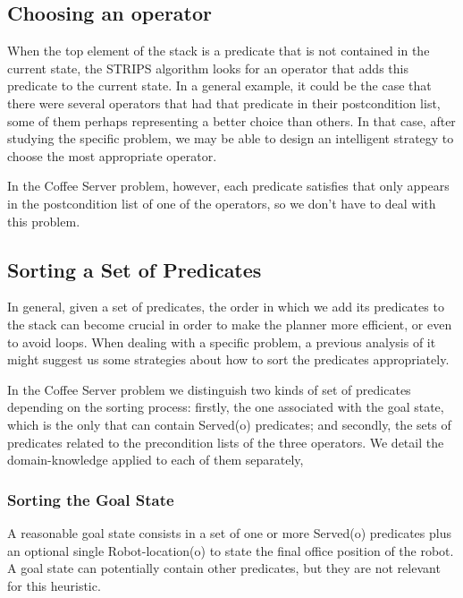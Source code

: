 \documentclass[12pt,a4paper,oneside]{article}
\numberwithin{equation}{section}
\numberwithin{equation}{section}
\theoremstyle{definition}
\begin{document}
\subsection{Choosing an operator} \label{Choosing an Operator}

When the top element of the stack is a predicate that is not contained in the current state, the STRIPS algorithm looks for an operator that adds this predicate to the current state. In a general example, it could be the case that there were several operators that had that predicate in their postcondition list, some of them perhaps representing a better choice than others. In that case, after studying the specific problem, we may be able to design an intelligent strategy to choose the most appropriate operator. 


In the Coffee Server problem, however, each predicate satisfies that only appears in the postcondition list of one of the operators, so we don’t have to deal with this problem.

\subsection{Sorting a Set of Predicates} \label{Sorting a Set of Predicates}

In general, given a set of predicates, the order in which we add its predicates to the stack can become crucial in order to make the planner more efficient, or even to avoid loops. When dealing with a specific problem, a previous analysis of it might suggest us some strategies about how to sort the predicates appropriately.


In the Coffee Server problem we distinguish two kinds of set of predicates depending on the sorting process: firstly, the one associated with the goal state, which is the only that can contain Served(o) predicates; and secondly, the sets of predicates related to the precondition lists of the three operators. We detail the domain-knowledge applied to each of them separately, 

\subsubsection{Sorting the Goal State}

A reasonable goal state consists in a set of one or more Served(o) predicates plus an optional single Robot-location(o) to state the final office position of the robot. A goal state can potentially contain other predicates, but they are not relevant for this heuristic.
\end{document}
